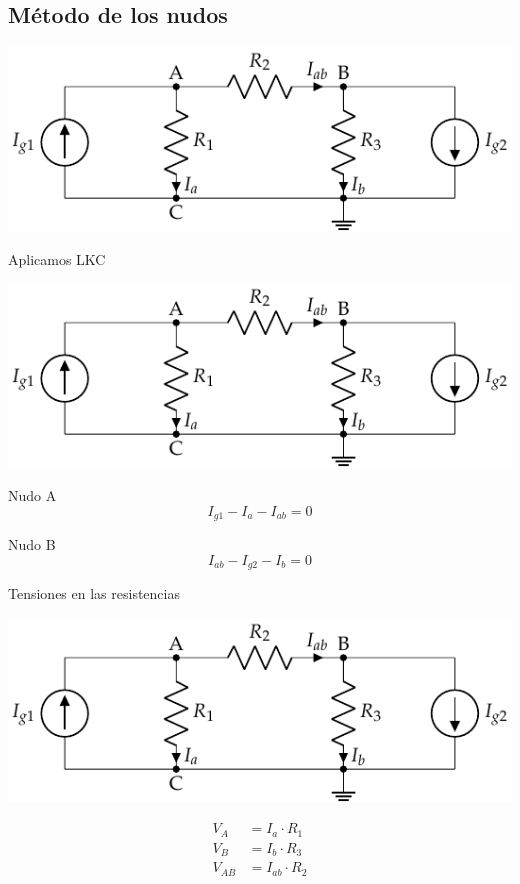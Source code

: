 \documentclass[aspectratio=169, usenames,svgnames,dvipsnames]{beamer}
\begin{document}
\subsection{Método de los nudos}
\label{sec:org67bb4e8}
\begin{frame}[label={sec:orge1fc86a}]{}
\begin{center}
\includegraphics[width=.9\linewidth]{../figs/nudos.pdf}
\end{center}
\end{frame}
\begin{frame}[label={sec:org235e385}]{Aplicamos LKC}
\begin{center}
\includegraphics[width=.9\linewidth]{../figs/nudos.pdf}
\end{center}

Nudo A
\begin{equation*}
  I_{g1} - I_a - I_{ab} = 0
\end{equation*}

Nudo B
\begin{equation*}
  I_{ab} - I_{g2} - I_b = 0
\end{equation*}
\end{frame}
\begin{frame}[label={sec:org5477822}]{Tensiones en las resistencias}
\begin{center}
\includegraphics[width=.9\linewidth]{../figs/nudos.pdf}
\end{center}

\begin{align*}
  V_A &= I_a \cdot R_1\\
  V_B &= I_b \cdot R_3\\
  V_{AB} &= I_{ab} \cdot R_2
\end{align*}
\end{frame}
\end{document}
